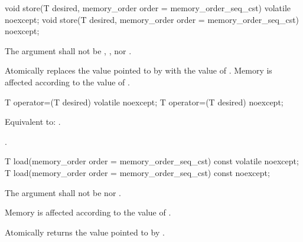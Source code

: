 %
%
%
%
%
\begin{itemdecl}
void store(T desired, memory_order order = memory_order_seq_cst) volatile noexcept;
void store(T desired, memory_order order = memory_order_seq_cst) noexcept;
\end{itemdecl}

\begin{itemdescr}
\pnum
\requires The  argument shall not be ,
, nor .

\pnum
\effects Atomically replaces the value pointed to by 
with the value of . Memory is affected according to the value of
.
\end{itemdescr}

%
%
%
\begin{itemdecl}
T operator=(T desired) volatile noexcept;
T operator=(T desired) noexcept;
\end{itemdecl}

\begin{itemdescr}
\pnum
\effects Equivalent to: .

\pnum
\returns {}.
\end{itemdescr}

%
%
%
%
%
\begin{itemdecl}
T load(memory_order order = memory_order_seq_cst) const volatile noexcept;
T load(memory_order order = memory_order_seq_cst) const noexcept;
\end{itemdecl}

\begin{itemdescr}
\pnum
\requires The  argument shall not be  nor .

\pnum
\effects Memory is affected according to the value of .

\pnum
\returns Atomically returns the value pointed to by .
\end{itemdescr}

